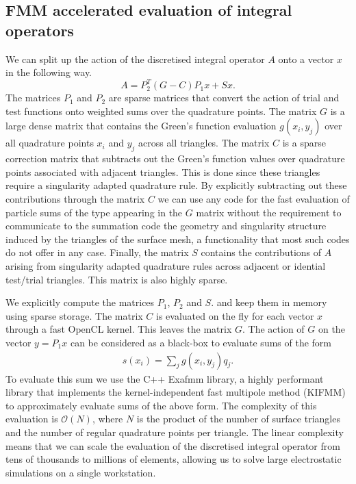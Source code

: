 \subsection{FMM accelerated evaluation of integral operators}
We can split up the action of the discretised integral operator $A$ onto a vector $x$ in the following way.
$$
A = P_2^T (G - C)P_1x + Sx.
$$
The matrices $P_1$ and $P_2$ are sparse matrices that convert the action of trial and test functions onto weighted sums over the quadrature points. The matrix $G$ is a large dense matrix that contains the Green's function evaluation $g(x_i, y_j)$ over all quadrature points $x_i$ and $y_j$ across all triangles. The matrix $C$ is a sparse correction matrix that subtracts out the Green's function values over quadrature points associated with  adjacent triangles. This is done since these triangles require a singularity adapted quadrature rule. By explicitly subtracting out these contributions through the matrix $C$ we can use any code for the fast evaluation of particle sums of the type appearing in the $G$ matrix without the requirement to communicate to the summation code the geometry and singularity structure induced by the triangles of the surface mesh, a functionality that most such codes do not offer in any case. Finally, the matrix $S$ contains the contributions of $A$ arising from singularity adapted quadrature rules across adjacent or idential test/trial triangles. This matrix is also highly sparse.

We explicitly compute the matrices $P_1$, $P_2$ and $S$. and keep them in memory using sparse storage. The matrix $C$ is evaluated on the fly for each vector $x$ through a fast OpenCL kernel. This leaves the matrix $G$. The action of $G$ on the vector $y=P_1x$ can be considered as a black-box to evaluate sums of the form
\begin{align}\label{eq:nbody_sum}
s(x_i) = \sum_j g(x_i, y_j)q_j.
\end{align}
To evaluate this sum we use the C++ Exafmm library, a highly performant library that implements the kernel-independent fast multipole method (KIFMM) to approximately evaluate sums of the above form. The complexity of this evaluation is $\mathcal{O}(N)$, where $N$ is the product of the number of surface triangles and the number of regular quadrature points per triangle. The linear complexity means that we can scale the evaluation of the discretised integral operator from tens of thousands to millions of elements, allowing us to solve large  electrostatic simulations on a single workstation.